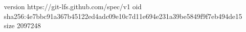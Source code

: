 version https://git-lfs.github.com/spec/v1
oid sha256:4e7bbc91a367b45122ed4adc09e10c7d11e694e231a39be5849f9f7eb494de15
size 2097248
